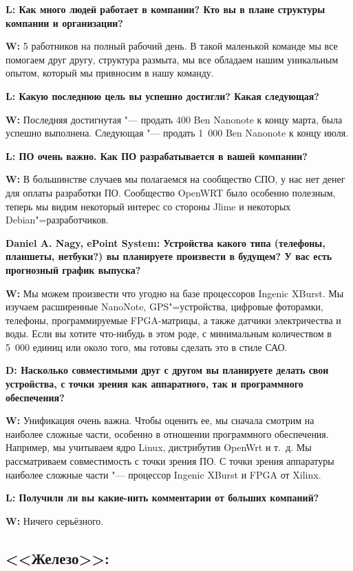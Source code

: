 \documentclass[10pt, a5paper]{article}
\begin{document}
{\noindent \bf L: Как много людей работает в компании? Кто вы в плане структуры компании и организации?}

{\noindent \bf W:} 5 работников на полный рабочий день. В такой маленькой команде мы все помогаем друг другу, структура размыта, мы все обладаем нашим уникальным опытом, который мы привносим в нашу команду.

{\noindent \bf L: Какую последнюю цель вы успешно достигли? Какая следующая?}

{\noindent \bf W:} Последняя достигнутая "--- продать 400 Ben Nanonote к концу марта, была успешно выполнена. Следующая "--- продать 1~000 Ben Nanonote к концу июля.

{\noindent \bf L: ПО очень важно. Как ПО разрабатывается в вашей компании?}

{\noindent \bf W:} В большинстве случаев мы полагаемся на сообщество СПО, у нас нет денег для оплаты разработки ПО. Сообщество OpenWRT было особенно полезным, теперь мы видим некоторый интерес со стороны Jlime и некоторых Debian"=разработчиков.

{\noindent \bf Daniel A. Nagy, ePoint System: Устройства какого типа (телефоны, планшеты, нетбуки?) вы планируете произвести в будущем? У вас есть прогнозный график выпуска?}

{\noindent \bf W:} Мы можем произвести что угодно на базе процессоров Ingenic XBurst. Мы изучаем расширенные NanoNote, GPS"=устройства, цифровые фоторамки, телефоны, программируемые FPGA-матрицы, а также датчики электричества и воды. Если вы хотите что-нибудь в этом роде, с минимальным количеством в 5~000 единиц или около того, мы готовы сделать это в стиле САО.

{\noindent \bf D: Насколько совместимыми друг с другом вы планируете делать свои устройства, с точки зрения как аппаратного, так и программного обеспечения?}

{\noindent \bf W:} Унификация очень важна. Чтобы оценить ее, мы сначала смотрим на наиболее сложные части, особенно в отношении программного обеспечения. Например, мы учитываем ядро Linux, дистрибутив OpenWrt и т.~д. Мы рассматриваем совместимость с точки зрения ПО. С точки зрения аппаратуры наиболее сложные части "--- процессор Ingenic XBurst и FPGA от Xilinx.

{\noindent \bf L: Получили ли вы какие-нить комментарии от больших компаний?}

{\noindent \bf W:} Ничего серьёзного.

\subsection*{<<Железо>>:}
\end{document}
